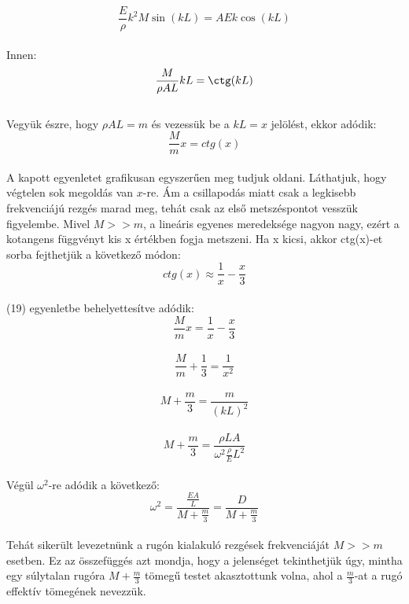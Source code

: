 \documentclass[a4paper]{article}
\begin{document}
\begin{equation}
\frac{E}{\rho} k^{2} M \sin(kL)=AEk \cos(kL)
\end{equation}
\\
Innen:
\begin{equation}
\frac{M}{\rho A L} kL =\ctg(kL)
\end{equation}
\\
Vegyük észre, hogy $\rho A L=m$ és vezessük be a $kL=x$ jelölést, ekkor adódik:
\begin{equation}
\frac{M}{m} x= ctg(x)
\end{equation}
\\
A kapott egyenletet grafikusan egyszerűen meg tudjuk oldani. Láthatjuk, hogy
végtelen sok megoldás van $x$-re. Ám a csillapodás miatt csak a legkisebb frekvenciájú rezgés marad meg, tehát csak az első metszéspontot vesszük figyelembe. Mivel $M >> m$, a lineáris egyenes meredeksége
nagyon nagy, ezért a kotangens függvényt kis x értékben fogja
metszeni. Ha x kicsi, akkor ctg(x)-et sorba fejthetjük a következő módon:
\begin{equation}
ctg(x) \approx \frac{1}{x}-\frac{x}{3}
\end{equation}
\\
(19) egyenletbe behelyettesítve adódik:
\begin{equation}
\frac{M}{m} x= \frac{1}{x}-\frac{x}{3}
\end{equation}
\\
\begin{equation}
\frac{M}{m} +\frac{1}{3}= \frac{1}{x^{2}}
\end{equation}
\\

\begin{equation}
M+\frac{m}{3} = \frac{m}{(kL)^{2}}
\end{equation}
\\
\begin{equation}
M+\frac{m}{3} = \frac{\rho L A}{\omega^{2} \frac{\rho}{E} L^{2}}
\end{equation}
\\
Végül $\omega^{2}$-re adódik a következő:
\begin{equation}
\omega^{2}=\frac{\frac{EA}{L}}{M+\frac{m}{3}}=\frac{D}{M+\frac{m}{3}}
\end{equation}
\\
Tehát sikerült levezetnünk a rugón kialakuló rezgések frekvenciáját $ M >> m $ esetben. Ez az összefüggés azt mondja, hogy a jelenséget tekinthetjük úgy, mintha egy súlytalan rugóra $M+\frac{m}{3}$ tömegű testet akasztottunk volna, ahol a $\frac{m}{3}$-at a rugó effektív tömegének nevezzük.
\end{document}
